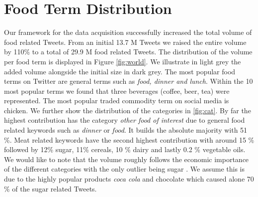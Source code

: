 \section {Food Term Distribution}

Our framework for the data acquisition successfully increased the total volume of food related Tweets. From an initial 13.7 M Tweets we raised the entire volume by 110\% to a total of 29.9 M food related Tweets. The distribution of the volume per food term is displayed in Figure \ref{fig:world}. We illustrate in light grey the added volume alongside the initial size in dark grey. The most popular food terms on Twitter are general terms such as \emph{food, dinner and lunch}. Within the 10 most popular terms we found that three beverages (coffee, beer, tea) were represented. The most popular traded commodity term on social media is chicken.  We further show the distribution of the categories in \ref{fig:cat}. By far the highest contribution has the category \emph{other food of interest} due to general food related keywords such as \emph{dinner} or \emph{food}. It builds the absolute majority with 51 \%. Meat related keywords have the second highest contribution with around 15 \% followed by 12\% sugar, 11\%  cereals, 10 \% dairy  and lastly 0.2 \% vegetable oils. We would like to note that the volume roughly follows the economic importance of the different categories with the only outlier being sugar \cite{fao2008}. We assume this is due to the highly popular products \emph{coca cola} and {chocolate} which caused alone 70 \% of the sugar related Tweets. 



